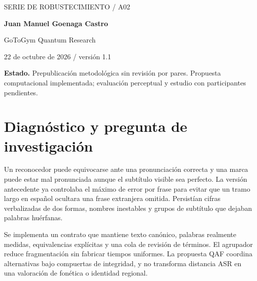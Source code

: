 \documentclass[10pt,a4paper]{article}
\begin{document}
\begin{center}{\sffamily\small\textcolor{mint}{SERIE DE ROBUSTECIMIENTO / A02}}\par\vspace{10pt}{\sffamily\LARGE\bfseries\textcolor{ink}{Inteligibilidad multilingüe y subtítulos medidos}}\par\vspace{7pt}{\large Separación de transcripción, fonética e identidad}\par\vspace{12pt}\textbf{Juan Manuel Goenaga Castro}\par GoToGym Quantum Research\par 22 de octubre de 2026 / versión 1.1\end{center}\colorbox{ink!6}{\parbox{.96\linewidth}{\small\textbf{Estado.} Prepublicación metodológica sin revisión por pares. Propuesta computacional implementada; evaluación perceptual y estudio con participantes pendientes.}}\begin{abstract}Se implementa un contrato que mantiene texto canónico, palabras realmente medidas, equivalencias explícitas y una cola de revisión de términos. El agrupador reduce fragmentación sin fabricar tiempos uniformes. La propuesta QAF coordina alternativas bajo compuertas de integridad, y no transforma distancia ASR en una valoración de fonética o identidad regional. Se presenta el problema observado, una formalización con unidades y restricciones, el código correspondiente y sus controles. Se distingue la verificación de ingeniería de calidad percibida, identidad regional y efecto comercial. El uso QAF corresponde a la región clásica identificable y conserva un comparador con los mismos recursos.\end{abstract}
\section{Diagnóstico y pregunta de investigación}
Un reconocedor puede equivocarse ante una pronunciación correcta y una marca puede estar mal pronunciada aunque el subtítulo visible sea perfecto. La versión antecedente ya controlaba el máximo de error por frase para evitar que un tramo largo en español ocultara una frase extranjera omitida. Persistían cifras verbalizadas de dos formas, nombres inestables y grupos de subtítulo que dejaban palabras huérfanas.

Se implementa un contrato que mantiene texto canónico, palabras realmente medidas, equivalencias explícitas y una cola de revisión de términos. El agrupador reduce fragmentación sin fabricar tiempos uniformes. La propuesta QAF coordina alternativas bajo compuertas de integridad, y no transforma distancia ASR en una valoración de fonética o identidad regional.
\end{document}
